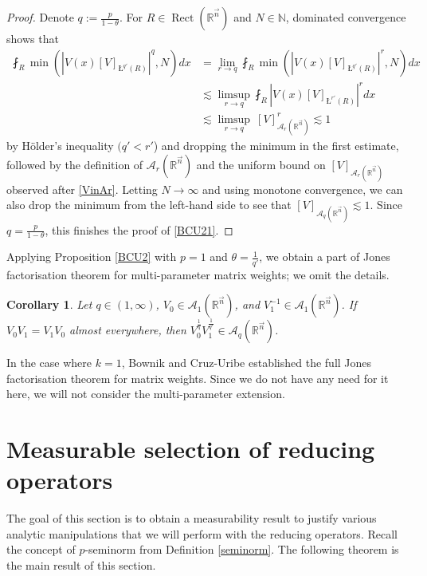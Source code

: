 \documentclass[11pt, reqno]{amsart}
\newtheorem{corollary}[theorem]{Corollary}
\theoremstyle{definition}
\theoremstyle{remark}
\numberwithin{equation}{section}
\newcommand{\A}{\mathscr A}
\newcommand{\N}{\mathbb N}
\newcommand{\R}{\mathbb R}
\newcommand{\vn}{\vec n}
\newcommand{\aveL}{\textit{\L}}
\newcommand{\abs}[1]{|#1|}
\begin{document}
\begin{proof}
Denote $q:=\frac{p}{1-\theta}$.
For $R\in\operatorname{Rect}(\R^{\vn})$ and $N\in\N$, dominated convergence shows that
\begin{equation*}
\begin{split}
  \fint_R\min(\abs{V(x)[V]_{\aveL^{q'}(R)}}^q,N)dx
  &=\lim_{r\to q}\fint_R\min(\abs{V(x)[V]_{\aveL^{q'}(R)}}^{r},N)dx \\
  &\lesssim\limsup_{r\to q}\fint_R\abs{V(x)[V]_{\aveL^{r'}(R)}}^{r}dx \\
  &\lesssim\limsup_{r\to q}\ [V]_{\A_{r}(\R^{\vn})}^r\lesssim 1
\end{split}
\end{equation*}
by H\"older's inequality $(q'<r'$) and dropping the minimum in the first estimate, followed by the definition of $\A_{r}(\R^{\vn})$ and the uniform bound on $[V]_{\A_r(\R^{\vn})}$ observed after \eqref{VinAr}. Letting $N\to\infty$ and using monotone convergence, we can also drop the minimum from the left-hand side to see that $[V]_{\A_q(\R^{\vn})}\lesssim 1$. Since $q=\frac{p}{1-\theta}$, this finishes the proof of \eqref{BCU21}.
\end{proof}

Applying Proposition \ref{BCU2} with $p=1$ and $\theta=\frac1{q'}$,
we obtain a part of Jones factorisation theorem for multi-parameter matrix weights; we omit the details.

\begin{corollary}\label{Jones}
Let $q\in(1,\infty)$, $V_0\in \A_1(\R^{\vn})$,
and $V_1^{-1}\in \A_1(\R^{\vn})$.
If $V_0V_1=V_1V_0$ almost everywhere,
then $V_0^{\frac1q} V_1^{\frac1{q'}}\in\A_q(\R^{\vn})$.
\end{corollary}

In the case where $k=1$, Bownik and Cruz-Uribe \cite[Theorem 1.3]{BCU}
established the full Jones factorisation theorem for matrix weights. Since we do not have any need for it here, we will not consider the multi-parameter extension.

\section{Measurable selection of reducing operators}\label{sec:meas}

The goal of this section is to obtain a measurability result
to justify various analytic manipulations that
we will perform with the reducing operators.
Recall the concept of $p$-seminorm from Definition \ref{seminorm}.
The following theorem is the main result of this section.
\end{document}
